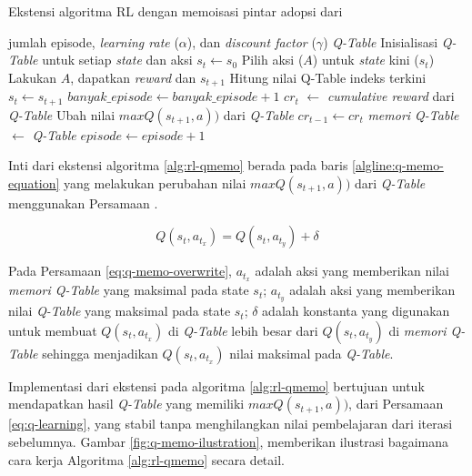 \begin{algorithm}
	\makeatletter
	\renewcommand{\ALG@name}{Algoritma}
	\makeatother
	\caption{Ekstensi algoritma \ac{RL} dengan memoisasi pintar adopsi dari \parencite{mazaya2024reinforcement}}\label{alg:rl-qmemo}
	\renewcommand{\algorithmicrequire}{\textbf{Masukan:}}
	\renewcommand{\algorithmicensure}{\textbf{Keluaran:}}
	\begin{algorithmic}[1]
		\Require jumlah episode, \textit{learning rate} ($\alpha$), dan \textit{discount factor} ($\gamma$)
		\Ensure \textit{Q-Table}
		\State Inisialisasi \textit{Q-Table} untuk setiap \textit{state} dan aksi
		\State $s_{t} \gets s_0$
		\State Pilih aksi ($A$) untuk \textit{state} kini ($s_t$)
		\State Lakukan $A$, dapatkan \textit{reward} dan $s_{t+1}$
		\State Hitung nilai Q-Table indeks terkini 
		\State $s_t \gets s_{t+1}$
		\EndWhile
		\State $banyak\_episode \gets banyak\_episode + 1$
		\State $cr_t$ $\gets$ \textit{cumulative reward} dari \textit{Q-Table}
		\State Ubah nilai $maxQ(s_{t+1},a))$ dari \textit{Q-Table} \label{algline:q-memo-equation} 
		\EndIf
		\State $cr_{t-1} \gets cr_t$
		\State \textit{memori Q-Table} $\gets$ \textit{Q-Table}
		\State $episode \gets episode + 1$
		\EndWhile
	\end{algorithmic}
\end{algorithm}

Inti dari ekstensi algoritma \ref{alg:rl-qmemo} berada pada baris \ref{algline:q-memo-equation} yang melakukan perubahan nilai $maxQ(s_{t+1},a))$ dari \textit{Q-Table} menggunakan Persamaan .

\begin{equation}
	\label{eq:q-memo-overwrite}
	Q(s_{t},a_{t_x}) =	Q(s_{t},a_{t_y}) + \delta
\end{equation}

Pada Persamaan \ref{eq:q-memo-overwrite}, \(a_{t_x}\) adalah aksi yang memberikan nilai \textit{memori Q-Table} yang maksimal pada state $s_t$; \(a_{t_y}\) adalah aksi yang memberikan nilai \textit{Q-Table} yang maksimal pada state $s_t$; \(\delta\) adalah konstanta yang digunakan untuk membuat \(Q(s_{t},a_{t_x})\) di \textit{Q-Table} lebih besar dari \(Q(s_{t},a_{t_y})\) di \textit{memori Q-Table} sehingga menjadikan \(Q(s_{t},a_{t_x})\) nilai maksimal pada \textit{Q-Table}.

Implementasi dari ekstensi pada algoritma \ref{alg:rl-qmemo} bertujuan untuk mendapatkan hasil \textit{Q-Table} yang memiliki $maxQ(s_{t+1},a))$, dari Persamaan \ref{eq:q-learning}, yang stabil tanpa menghilangkan nilai pembelajaran dari iterasi sebelumnya. Gambar \ref{fig:q-memo-ilustration}, memberikan ilustrasi bagaimana cara kerja Algoritma \ref{alg:rl-qmemo} secara detail.

